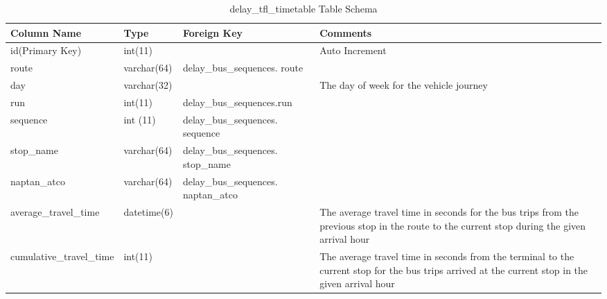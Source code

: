 \begin{appendices}
\begin{table}
\centering
\begin{tabular}{@{}llp{4cm}p{4cm}@{}} \toprule
Column Name & Type & Foreign Key & Comments\\ \midrule
id(Primary Key) & int(11) & & Auto Increment\\ [0.4cm]
route & varchar(64) & delay\_bus\_sequences. route \\ [0.4cm]
day & varchar(32) & & The day of week for the vehicle journey \\ [0.4cm]
run & int(11) & delay\_bus\_sequences.run \\ [0.4cm]
sequence & int (11) & delay\_bus\_sequences. sequence \\ [0.4cm]
stop\_name & varchar(64) & delay\_bus\_sequences. stop\_name \\ [0.4cm]
naptan\_atco & varchar(64) & delay\_bus\_sequences. naptan\_atco \\ [0.4cm]
average\_travel\_time & datetime(6) & & The average travel time in seconds for the bus trips from the previous stop in the route to the current stop during the given arrival hour \\ [0.4cm]
cumulative\_travel\_time & int(11) & & The average travel time in seconds from the terminal to the current stop for the bus trips arrived at the current stop in the given arrival hour \\
\bottomrule
\end{tabular}
\caption{delay\_tfl\_timetable Table Schema}
\label{table:delay_tfl_timetable}
\end{table}
\end{appendices}

